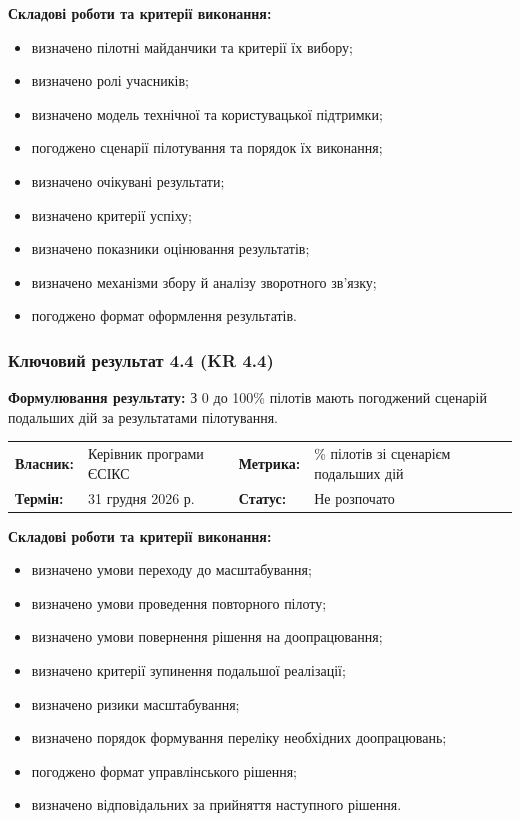 \documentclass{article}
\begin{document}
\vspace{10pt}
\textbf{Складові роботи та критерії виконання:}
\begin{itemize}
    \item визначено пілотні майданчики та критерії їх вибору;
    \item визначено ролі учасників;
    \item визначено модель технічної та користувацької підтримки;
    \item погоджено сценарії пілотування та порядок їх виконання;
    \item визначено очікувані результати;
    \item визначено критерії успіху;
    \item визначено показники оцінювання результатів;
    \item визначено механізми збору й аналізу зворотного зв’язку;
    \item погоджено формат оформлення результатів.
\end{itemize}

\subsubsection{Ключовий результат 4.4 (KR 4.4)}

\textbf{Формулювання результату:} З 0 до 100\% пілотів мають погоджений сценарій подальших дій за результатами пілотування.

\noindent\begin{tabular}{@{}p{2.2cm}p{4.5cm}p{2.2cm}p{4.5cm}@{}}
\toprule
\textbf{Власник:} & Керівник програми ЄСІКС & \textbf{Метрика:} & \% пілотів зі сценарієм подальших дій \\
\textbf{Термін:} & 31 грудня 2026 р. & \textbf{Статус:} & Не розпочато \\
\bottomrule
\end{tabular}

\vspace{10pt}
\textbf{Складові роботи та критерії виконання:}
\begin{itemize}
    \item визначено умови переходу до масштабування;
    \item визначено умови проведення повторного пілоту;
    \item визначено умови повернення рішення на доопрацювання;
    \item визначено критерії зупинення подальшої реалізації;
    \item визначено ризики масштабування;
    \item визначено порядок формування переліку необхідних доопрацювань;
    \item погоджено формат управлінського рішення;
    \item визначено відповідальних за прийняття наступного рішення.
\end{itemize}
\end{document}
